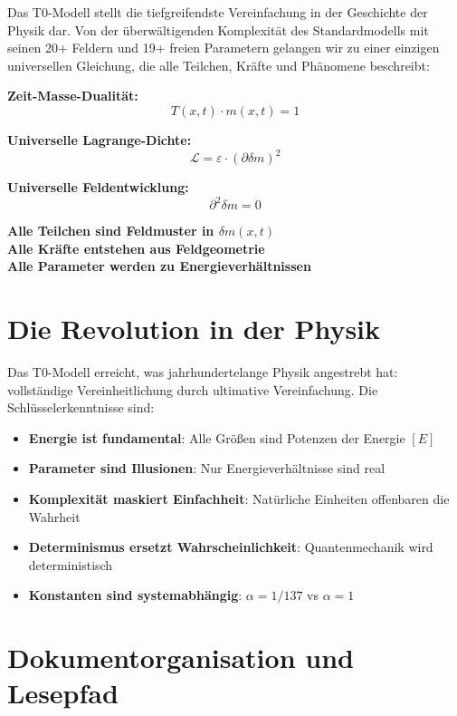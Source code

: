 \documentclass[12pt,a4paper]{report}
\begin{document}
	Das T0-Modell stellt die tiefgreifendste Vereinfachung in der Geschichte der Physik dar. Von der überwältigenden Komplexität des Standardmodells mit seinen 20+ Feldern und 19+ freien Parametern gelangen wir zu einer einzigen universellen Gleichung, die alle Teilchen, Kräfte und Phänomene beschreibt:
	
	\begin{tcolorbox}[colback=blue!5!white,colframe=blue!75!black,title=Das universelle T0-Framework]
		\textbf{Zeit-Masse-Dualität:} 
		$$T(x,t) \cdot m(x,t) = 1$$
		
		\textbf{Universelle Lagrange-Dichte:}
		$$\mathcal{L} = \varepsilon \cdot (\partial \delta m)^2$$
		
		\textbf{Universelle Feldentwicklung:}
		$$\partial^2 \delta m = 0$$
		
		\textbf{Alle Teilchen sind Feldmuster in $\delta m(x,t)$}\\
		\textbf{Alle Kräfte entstehen aus Feldgeometrie}\\
		\textbf{Alle Parameter werden zu Energieverhältnissen}
	\end{tcolorbox}
	
	\section{Die Revolution in der Physik}
	
	Das T0-Modell erreicht, was jahrhundertelange Physik angestrebt hat: vollständige Vereinheitlichung durch ultimative Vereinfachung. Die Schlüsselerkenntnisse sind:
	
	\begin{itemize}
		\item \textbf{Energie ist fundamental}: Alle Größen sind Potenzen der Energie $[E]$
		\item \textbf{Parameter sind Illusionen}: Nur Energieverhältnisse sind real
		\item \textbf{Komplexität maskiert Einfachheit}: Natürliche Einheiten offenbaren die Wahrheit
		\item \textbf{Determinismus ersetzt Wahrscheinlichkeit}: Quantenmechanik wird deterministisch
		\item \textbf{Konstanten sind systemabhängig}: $\alpha = 1/137$ vs $\alpha = 1$
	\end{itemize}
	
	\section{Dokumentorganisation und Lesepfad}
	
\end{document}
